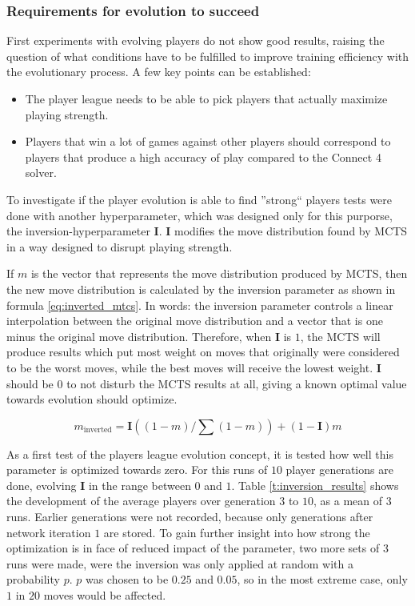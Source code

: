 \documentclass[12pt,onecolumn,oneside,titlepage]{article}
\begin{document}
\subsubsection{Requirements for evolution to succeed}

First experiments with evolving players do not show good results, raising the question of what conditions have to be fulfilled to improve training efficiency with the evolutionary process.
A few key points can be established:

\begin{itemize}
 \item The player league needs to be able to pick players that actually maximize playing strength.
 \item Players that win a lot of games against other players should correspond to players that produce a high accuracy of play compared to the Connect 4 solver.
\end{itemize}

To investigate if the player evolution is able to find ''strong`` players tests were done with another hyperparameter, which was designed only for this purporse, the inversion-hyperparameter $\mathbf{I}$.
$\mathbf{I}$ modifies the move distribution found by MCTS in a way designed to disrupt playing strength.

If $m$ is the vector that represents the move distribution produced by MCTS, then the new move distribution is calculated by the inversion parameter as shown in formula \ref{eq:inverted_mtcs}.
In words: the inversion parameter controls a linear interpolation between the original move distribution and a vector that is one minus the original move distribution. Therefore, when $\mathbf{I}$ is $1$, the MCTS will produce results which put most weight on moves that originally
were considered to be the worst moves, while the best moves will receive the lowest weight. $\mathbf{I}$ should be $0$ to not disturb the MCTS results at all, giving a known optimal value towards evolution should optimize.

\begin{equation}
 m_\text{inverted} = \mathbf{I}((1 - m) / \sum(1 - m)) + (1 - \mathbf{I}) m \label{eq:inverted_mtcs}
\end{equation}

As a first test of the players league evolution concept, it is tested how well this parameter is optimized towards zero. For this runs of $10$ player generations are done, evolving $\mathbf{I}$ in the range between $0$ and $1$.
Table \ref{t:inversion_results} shows the development of the average players over generation $3$ to $10$, as a mean of $3$ runs. Earlier generations were not recorded, because only generations after network iteration $1$ are stored.
To gain further insight into how strong the optimization is in face of reduced impact of the parameter, two more sets of $3$ runs were made, were the inversion was only applied at random with a probability $p$. $p$ was chosen to be $0.25$ and $0.05$, so in the most extreme case,
only $1$ in $20$ moves would be affected.
\end{document}
